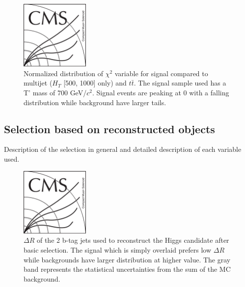 \begin{figure}[!Hhtbp]
  \begin{center}
    \includegraphics[width=0.3\textwidth]{figs/CMSlogo.png}
    \caption{Normalized distribution of $\chi^{2}$ variable for signal compared to multijet ($H_{T}$ [500, 1000] only) and $t\bar{t}$. The signal sample used has a T' mass of 700 GeV/$c^{2}$. Signal events are peaking at 0 with a falling distribution while background
    have larger tails.}
    \label{fig:chi2}
  \end{center}
\end{figure}\clearpage

\subsection{Selection based on reconstructed objects}

Description of the selection in general and detailed description of each variable used.

\begin{figure}[!Hhtbp]
  \begin{center}
    \includegraphics[width=0.3\textwidth]{figs/CMSlogo.png}
    \caption{$\Delta R$ of the 2 b-tag jets used to reconstruct the Higgs candidate after basic selection. The signal which is simply overlaid prefers low $\Delta R$ while backgrounds have larger distribution at higher value. The gray band represents the statistical uncertainties from the sum of the MC background.}
    \label{fig:DRbb}
  \end{center}
\end{figure}\clearpage

